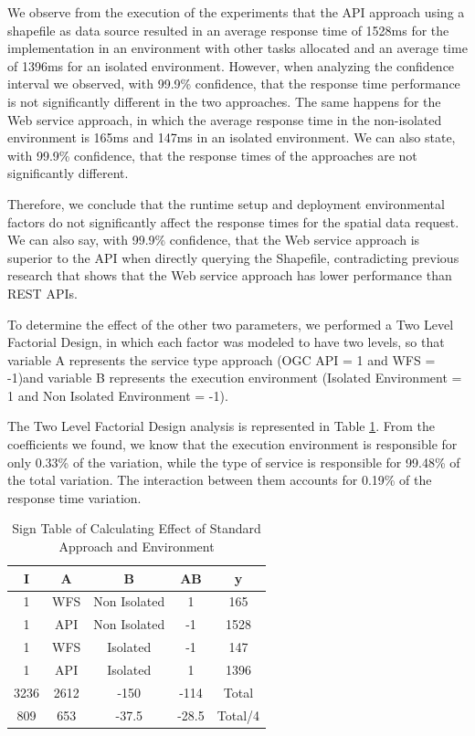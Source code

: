 We observe from the execution of the experiments that the API approach using a shapefile as data source resulted in an average response time of 1528ms for the implementation in an environment with other tasks allocated and an average time of 1396ms for an isolated environment. 
\newpage
However, when analyzing the confidence interval we observed, with 99.9\% confidence, that the response time performance is not significantly different in the two approaches. The same happens for the Web service approach, in which the average response time in the non-isolated environment is 165ms and 147ms in an isolated environment. We can also state, with 99.9\% confidence, that the response times of the approaches are not significantly different. 

Therefore, we conclude that the runtime setup and deployment environmental factors do not significantly affect the response times for the spatial data request. We can also say, with 99.9\% confidence, that the Web service approach is superior to the API when directly querying the Shapefile, contradicting previous research \cite{mumbaikar2013web} that shows that the Web service approach has lower performance than REST APIs.

To determine the effect of the other two parameters, we performed a Two Level Factorial Design, in which each factor was modeled to have two levels, so that variable A represents the service type approach (OGC API = 1 and WFS = -1)and variable B represents the execution environment (Isolated Environment = 1 and Non Isolated Environment = -1).


 The Two Level Factorial Design analysis is represented in Table \ref{tab:twofactorialdesignLimite}.
 From the coefficients we found, we know that the execution environment is responsible for only 0.33\% of the variation, while the type of service is responsible for 99.48\% of the total variation. The interaction between them accounts for 0.19\% of the response time variation.


\begin{table}[H]
\centering
\caption{Sign Table of Calculating Effect of Standard Approach and Environment}
\label{tab:twofactorialdesignLimite}
\begin{tabular}{ccccc}
\hline
I    & A    & B     & AB    & y       \\ \hline
1    & WFS   & Non Isolated    & 1     & 165     \\
1    & API     & Non Isolated    & -1    & 1528    \\
1    & WFS   & Isolated     & -1    & 147     \\
1    & API    & Isolated     & 1    & 1396     \\
3236 & 2612 & -150  & -114  & Total   \\
809  & 653  & -37.5 & -28.5 & Total/4 \\ \hline
\end{tabular}
\end{table}

